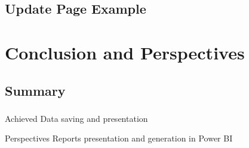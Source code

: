 \subsection{Update Page Example}
\begin{frame}[fragile=singleslide]{\insertsectionhead}
  \framesubtitle{\insertsubsectionhead}
  \begin{figure}[b]
  \end{figure}
\end{frame}

\section{Conclusion and Perspectives}

\subsection{Summary}
\begin{frame}
  \frametitle{\insertsectionhead}
  \framesubtitle{\insertsubsectionhead}
  \begin{exampleblock}{Achieved}
    Data saving and presentation
  \end{exampleblock}
  \begin{alertblock}{Perspectives}
    Reports presentation and generation in Power BI
  \end{alertblock}
\end{frame}
